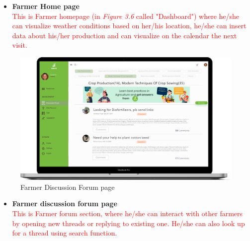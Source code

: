 \begin{itemize}
    \item \textbf{Farmer Home page}\\ 
    \textcolor{red}{This is Farmer homepage (in \textit{Figure 3.6} called "Dashboard") where he/she can visualize weather conditions based on her/his location, he/she can insert data about his/her production and can visualize on the calendar the next visit.}
\end{itemize}


\begin{figure}[H]
  \includegraphics[width=140mm,scale=0.9]{./Images//Mocks/WebApp/Farmer_Forum.png}
  \caption{Farmer Discussion Forum page}
\end{figure}

\begin{itemize}
    \item \textbf{Farmer discussion forum page}\\ 
    \textcolor{red}{This is Farmer forum section, where he/she can interact with other farmers by opening new threads or replying to existing one.
    He/she can also look up for a thread using search function.}
\end{itemize}


